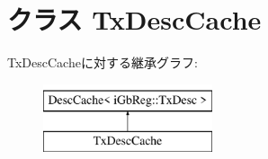 \hypertarget{classIGbE_1_1TxDescCache}{
\section{クラス TxDescCache}
\label{classIGbE_1_1TxDescCache}
}
TxDescCacheに対する継承グラフ:\begin{figure}[H]
\begin{center}
\leavevmode
\includegraphics[height=2cm]{classIGbE_1_1TxDescCache}
\end{center}
\end{figure}
